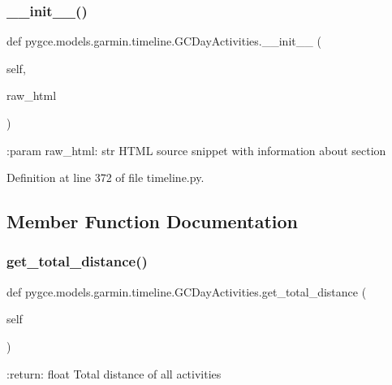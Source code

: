 \subsubsection{\texorpdfstring{\+\_\+\+\_\+init\+\_\+\+\_\+()}{\_\_init\_\_()}}
{\footnotesize\ttfamily def pygce.\+models.\+garmin.\+timeline.\+G\+C\+Day\+Activities.\+\_\+\+\_\+init\+\_\+\+\_\+ (\begin{DoxyParamCaption}\item[{}]{self,  }\item[{}]{raw\+\_\+html }\end{DoxyParamCaption})}

\begin{DoxyVerb}:param raw_html: str
    HTML source snippet with information about section
\end{DoxyVerb}
 

Definition at line 372 of file timeline.\+py.



\subsection{Member Function Documentation}
\mbox{\label{classpygce_1_1models_1_1garmin_1_1timeline_1_1_g_c_day_activities_a2ad838af777ce178392b5f61ee6e6561}} 
\subsubsection{\texorpdfstring{get\+\_\+total\+\_\+distance()}{get\_total\_distance()}}
{\footnotesize\ttfamily def pygce.\+models.\+garmin.\+timeline.\+G\+C\+Day\+Activities.\+get\+\_\+total\+\_\+distance (\begin{DoxyParamCaption}\item[{}]{self }\end{DoxyParamCaption})}

\begin{DoxyVerb}:return: float
    Total distance of all activities
\end{DoxyVerb}
 

